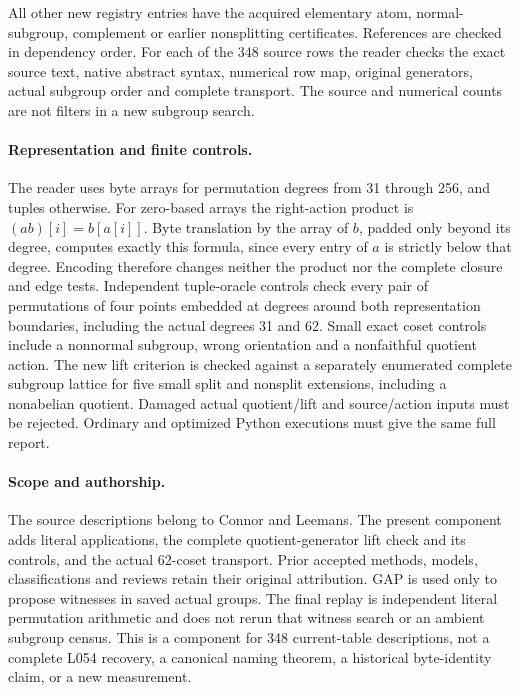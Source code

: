 \documentclass[11pt]{article}
\begin{document}
All other new registry entries have the acquired elementary atom,
normal-subgroup, complement or earlier nonsplitting certificates. References
are checked in dependency order. For each of the 348 source rows the reader
checks the exact source text, native abstract syntax, numerical row map,
original generators, actual subgroup order and complete transport. The
source and numerical counts are not filters in a new subgroup search.

\paragraph{Representation and finite controls.}
The reader uses byte arrays for permutation degrees from 31 through 256,
and tuples otherwise. For zero-based arrays the right-action product is
$(ab)[i]=b[a[i]]$. Byte translation by the array of $b$, padded only beyond
its degree, computes exactly this formula, since every entry of $a$ is
strictly below that degree. Encoding therefore changes neither the product
nor the complete closure and edge tests.
Independent tuple-oracle controls check every pair of permutations of four
points embedded at degrees around both representation boundaries, including
the actual degrees 31 and 62. Small exact coset controls include a nonnormal
subgroup, wrong orientation and a nonfaithful quotient action.
The new lift criterion is checked against a separately enumerated complete
subgroup lattice for five small split and nonsplit extensions, including a
nonabelian quotient. Damaged actual quotient/lift and source/action inputs
must be rejected. Ordinary and optimized Python executions must give the
same full report.

\paragraph{Scope and authorship.}
The source descriptions belong to Connor and Leemans. The present component
adds literal applications, the complete quotient-generator lift check and
its controls, and the actual 62-coset transport. Prior accepted methods,
models, classifications and reviews retain their original attribution.
GAP is used only to propose witnesses in saved actual groups. The final
replay is independent literal permutation arithmetic and does not rerun
that witness search or an ambient subgroup census. This is a component for
348 current-table descriptions, not a complete L054 recovery, a canonical
naming theorem, a historical byte-identity claim, or a new measurement.
\end{document}
